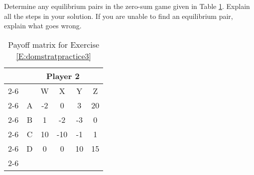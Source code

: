 \begin{xca}\label{E:domstratpractice3} Determine any equilibrium pairs in the zero-sum game given in Table \ref{T:domstratpractice3}.  Explain all the steps in your solution. If you are unable to find an equilibrium pair, explain what goes wrong.




\begin{table}[h]
\centering
\begin{tabular}{lccccc}
                      & \multicolumn{5}{c}{Player 2}                                                                                                  \\ \cline{2-6} 
\multicolumn{1}{l|}{} & \multicolumn{1}{c|}{} & \multicolumn{1}{c|}{W} & \multicolumn{1}{c|}{X} & \multicolumn{1}{c|}{Y} & \multicolumn{1}{c|}{Z} \\ \cline{2-6} 
\multicolumn{1}{l|}{Player 1} & \multicolumn{1}{c|}{A} & \multicolumn{1}{c|}{-2} & \multicolumn{1}{c|}{0} & \multicolumn{1}{c|}{3} & \multicolumn{1}{c|}{20} \\ \cline{2-6} 
\multicolumn{1}{l|}{} & \multicolumn{1}{c|}{B} & \multicolumn{1}{c|}{1} & \multicolumn{1}{c|}{-2} & \multicolumn{1}{c|}{-3} & \multicolumn{1}{c|}{0} \\ \cline{2-6} 
\multicolumn{1}{l|}{} & \multicolumn{1}{c|}{C} & \multicolumn{1}{c|}{10} & \multicolumn{1}{c|}{-10} & \multicolumn{1}{c|}{-1} & \multicolumn{1}{c|}{1} \\ \cline{2-6} 
\multicolumn{1}{l|}{} & \multicolumn{1}{c|}{D} & \multicolumn{1}{c|}{0} & \multicolumn{1}{c|}{0} & \multicolumn{1}{c|}{10} & \multicolumn{1}{c|}{15} \\ \cline{2-6} 
\end{tabular}
\caption{Payoff matrix for Exercise \ref{E:domstratpractice3}}
\label{T:domstratpractice3}

\end{table}
\end{xca}


